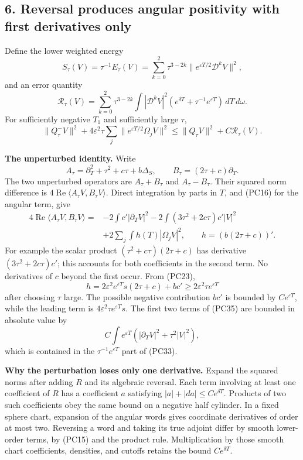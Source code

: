 \documentclass[
  11pt,
]{article}
\begin{document}
\subsection{6. Reversal produces angular positivity with first
derivatives
only}\label{reversal-produces-angular-positivity-with-first-derivatives-only}

Define the lower weighted energy \[
S_\tau(V)=\tau^{-1}E_\tau(V)
=\sum_{k=0}^2\tau^{3-2k}
              \|e^{\varepsilon T/2}\mathscr D^kV\|^2,
\tag{PC32}
\] and an error quantity \[
\mathcal R_\tau(V)=\sum_{k=0}^2\tau^{3-2k}
 \int |\mathscr D^kV|^2
                 (e^{\delta T}+\tau^{-1}e^{\varepsilon T})\,dT\,d\omega.
\tag{PC33}
\] For sufficiently negative \(T_1\) and sufficiently large \(\tau\), \[
\|Q_\tau^-V\|^2
 +4\varepsilon^2\tau\sum_j\|e^{\varepsilon T/2}\Omega_jV\|^2
\leq\|Q_\tau V\|^2+C\mathcal R_\tau(V).
\tag{PC34}
\]

\textbf{The unperturbed identity.} Write \[
A_\tau=\partial_T^2+\tau^2+c\tau+b\Delta_S,
\qquad B_\tau=(2\tau+c)\partial_T.
\] The two unperturbed operators are \(A_\tau+B_\tau\) and
\(A_\tau-B_\tau\). Their squared norm difference is
\(4\operatorname{Re}\langle A_\tau V,B_\tau V\rangle\). Direct
integration by parts in \(T\), and (PC16) for the angular term, give \[
\begin{split}
4\operatorname{Re}\langle A_\tau V,B_\tau V\rangle
={}&-2\int c'|\partial_TV|^2
 -2\int (3\tau^2+2c\tau)c'|V|^2\\
 &+2\sum_j\int h(T)|\Omega_jV|^2,
\qquad h=(b(2\tau+c))'.
\end{split}
\tag{PC35}
\] For example the scalar product \((\tau^2+c\tau)(2\tau+c)\) has
derivative \((3\tau^2+2c\tau)c'\); this accounts for both coefficients
in the second term. No derivatives of \(c\) beyond the first occur. From
(PC23), \[
h=2\varepsilon^2e^{\varepsilon T}s(2\tau+c)+bc'
\geq2\varepsilon^2\tau e^{\varepsilon T}
\tag{PC36}
\] after choosing \(\tau\) large. The possible negative contribution
\(bc'\) is bounded by \(Ce^{\varepsilon T}\), while the leading term is
\(4\varepsilon^2\tau e^{\varepsilon T}s\). The first two terms of (PC35)
are bounded in absolute value by \[
C\int e^{\varepsilon T}
               (|\partial_TV|^2+\tau^2|V|^2),
\tag{PC37}
\] which is contained in the \(\tau^{-1}e^{\varepsilon T}\) part of
(PC33).

\textbf{Why the perturbation loses only one derivative.} Expand the
squared norms after adding \(R\) and its algebraic reversal. Each term
involving at least one coefficient of \(R\) has a coefficient \(a\)
satisfying \(|a|+|da|\leq Ce^{\delta T}\). Products of two such
coefficients obey the same bound on a negative half cylinder. In a fixed
sphere chart, expansion of the angular words gives coordinate
derivatives of order at most two. Reversing a word and taking its true
adjoint differ by smooth lower-order terms, by (PC15) and the product
rule. Multiplication by those smooth chart coefficients, densities, and
cutoffs retains the bound \(Ce^{\delta T}\).
\end{document}
